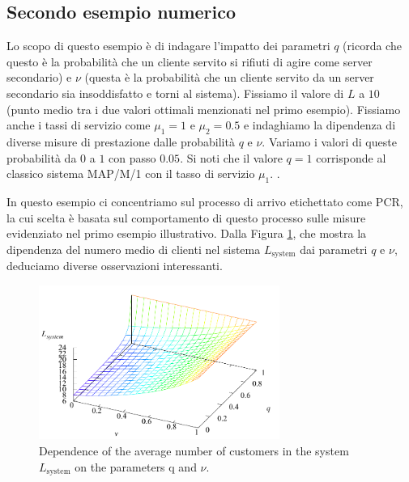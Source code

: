 \documentclass[11pt]{article}
\begin{document}
\clearpage

\subsection{Secondo esempio numerico}
Lo scopo di questo esempio è di indagare l'impatto dei parametri $q$ (ricorda che questo è la probabilità che un cliente servito si rifiuti di agire come server secondario) e $\nu$ (questa è la probabilità che un cliente servito da un server secondario sia insoddisfatto e torni al sistema). Fissiamo il valore di $L$ a $10$ (punto medio tra i due valori ottimali menzionati nel primo esempio). Fissiamo anche i tassi di servizio come $\mu_1 = 1$ e $\mu_2 = 0.5$ e indaghiamo la dipendenza di diverse misure di prestazione dalle probabilità $q$ e $\nu$. Variamo i valori di queste probabilità da $0$ a $1$ con passo $0.05$. Si noti che il valore $q = 1$ corrisponde al classico sistema MAP/M/1 con il tasso di servizio $\mu_1$. \vspace{0.4cm}.

\noindent In questo esempio ci concentriamo sul processo di arrivo etichettato come PCR, la cui scelta è basata sul comportamento di questo processo sulle misure evidenziato nel primo esempio illustrativo. Dalla Figura \ref{fig:6}, che mostra la dipendenza del numero medio di clienti nel sistema $L_\mathrm{system}$ dai parametri $q$ e $\nu$, deduciamo diverse osservazioni interessanti.

\begin{figure}[h]
    \centering
    \includegraphics[width=0.7\textwidth]{qUQVrEZ.png}
    \caption{Dependence of the average number of customers in the system $L_\mathrm{system}$ on the parameters q and $\nu$.}
    \label{fig:6}
\end{figure}
\end{document}
